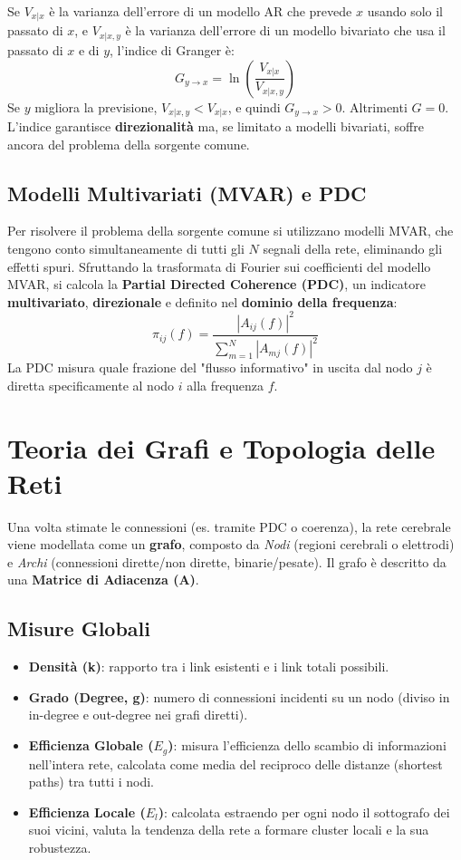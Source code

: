 Se $V_{x|x}$ è la varianza dell'errore di un modello AR che prevede $x$ usando solo il passato di $x$, e $V_{x|x,y}$ è la varianza dell'errore di un modello bivariato che usa il passato di $x$ e di $y$, l'indice di Granger è:
\begin{equation}
G_{y \to x} = \ln \left( \frac{V_{x|x}}{V_{x|x,y}} \right)
\end{equation}
Se $y$ migliora la previsione, $V_{x|x,y} < V_{x|x}$, e quindi $G_{y \to x} > 0$. Altrimenti $G = 0$.
L'indice garantisce \textbf{direzionalità} ma, se limitato a modelli bivariati, soffre ancora del problema della sorgente comune.

\subsection{Modelli Multivariati (MVAR) e PDC}
Per risolvere il problema della sorgente comune si utilizzano modelli MVAR, che tengono conto simultaneamente di tutti gli $N$ segnali della rete, eliminando gli effetti spuri. 
Sfruttando la trasformata di Fourier sui coefficienti del modello MVAR, si calcola la \textbf{Partial Directed Coherence (PDC)}, un indicatore \textbf{multivariato}, \textbf{direzionale} e definito nel \textbf{dominio della frequenza}:
\begin{equation}
\pi_{ij}(f) = \frac{|A_{ij}(f)|^2}{\sum_{m=1}^{N} |A_{mj}(f)|^2}
\end{equation}
La PDC misura quale frazione del "flusso informativo" in uscita dal nodo $j$ è diretta specificamente al nodo $i$ alla frequenza $f$.

\section{Teoria dei Grafi e Topologia delle Reti}

Una volta stimate le connessioni (es. tramite PDC o coerenza), la rete cerebrale viene modellata come un \textbf{grafo}, composto da \textit{Nodi} (regioni cerebrali o elettrodi) e \textit{Archi} (connessioni dirette/non dirette, binarie/pesate). Il grafo è descritto da una \textbf{Matrice di Adiacenza (A)}.

\subsection{Misure Globali}
\begin{itemize}
    \item \textbf{Densità (k)}: rapporto tra i link esistenti e i link totali possibili.
    \item \textbf{Grado (Degree, g)}: numero di connessioni incidenti su un nodo (diviso in in-degree e out-degree nei grafi diretti).
    \item \textbf{Efficienza Globale ($E_g$)}: misura l'efficienza dello scambio di informazioni nell'intera rete, calcolata come media del reciproco delle distanze (shortest paths) tra tutti i nodi.
    \item \textbf{Efficienza Locale ($E_l$)}: calcolata estraendo per ogni nodo il sottografo dei suoi vicini, valuta la tendenza della rete a formare cluster locali e la sua robustezza.
\end{itemize}

